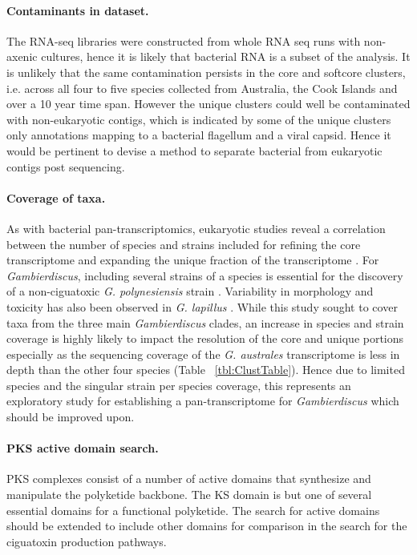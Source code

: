 \documentclass[12pt]{article}
\begin{document}
\paragraph{Contaminants in dataset.}
The RNA-seq libraries were constructed from whole RNA seq runs with non-axenic cultures, hence it is likely that bacterial RNA is a subset of the analysis. 
It is unlikely that the same contamination persists in the core and softcore clusters, i.e. across all four to five species collected from Australia, the Cook Islands and over a 10 year time span. 
However the unique clusters could well be contaminated with non-eukaryotic contigs, which is indicated by some of the unique clusters only annotations mapping to a bacterial flagellum and a viral capsid. %
Hence it would be pertinent to  devise a method to separate bacterial from eukaryotic contigs post sequencing. 


\paragraph{Coverage of taxa.}
As with bacterial pan-transcriptomics, eukaryotic studies reveal a correlation between the number of species and strains included for refining the core transcriptome and expanding the unique fraction of the transcriptome \cite{koid2014comparative,tettelin2005genome,jin2016maize}. 
For \textit{Gambierdiscus}, including several strains of a species is essential for the discovery of a non-ciguatoxic \textit{G. polynesiensis} strain \cite{rhodes2017epiphytic}. 
Variability in morphology and toxicity has also been observed in \textit{G. lapillus} \cite{kretzschmar2017characterization}. 
While this study sought to cover taxa from the three main \textit{Gambierdiscus} clades, an increase in species and strain coverage is highly likely to impact the resolution of the core and unique portions especially as the sequencing coverage of the \textit{G. australes} transcriptome is less in depth than the other four species (Table ~\ref{tbl:ClustTable}).
Hence due to limited species and the singular strain per species coverage, this represents an exploratory study for establishing a pan-transcriptome for \textit{Gambierdiscus} which should be improved upon. 

\paragraph{PKS active domain search.}
PKS complexes consist of a number of active domains that synthesize and manipulate the polyketide backbone. 
The KS domain is but one of several essential domains for a functional polyketide. 
The search for active domains should be extended to include other domains for comparison in the search for the ciguatoxin production pathways.
\end{document}
